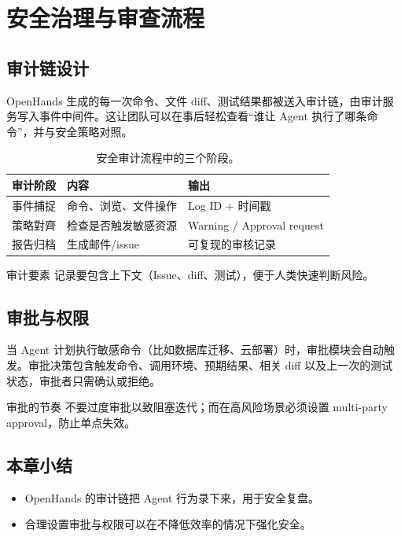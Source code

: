 \section{安全治理与审查流程}
\subsection{审计链设计}
OpenHands 生成的每一次命令、文件 diff、测试结果都被送入审计链，由审计服务写入事件中间件。这让团队可以在事后轻松查看“谁让 Agent 执行了哪条命令”，并与安全策略对照。

\begin{table}[H]
\centering
\begin{tabular}{p{} p{} p{}}
\toprule
审计阶段 & 内容 & 输出 \\
\midrule
事件捕捉 & 命令、浏览、文件操作 & Log ID + 时间戳 \\
\midrule
策略對齊 & 检查是否触发敏感资源 & Warning / Approval request \\
\midrule
报告归档 & 生成邮件/issue & 可复现的审核记录 \\
\bottomrule
\end{tabular}
\caption{安全审计流程中的三个阶段。}
\end{table}

\begin{importantbox}{审计要素}
记录要包含上下文（Issue、diff、测试），便于人类快速判断风险。
\end{importantbox}

\subsection{审批与权限}
当 Agent 计划执行敏感命令（比如数据库迁移、云部署）时，审批模块会自动触发。审批决策包含触发命令、调用环境、预期结果、相关 diff 以及上一次的测试状态，审批者只需确认或拒绝。

\begin{warningbox}{审批的节奏}
不要过度审批以致阻塞迭代；而在高风险场景必须设置 multi-party approval，防止单点失效。
\end{warningbox}

\subsection{本章小结}
\begin{itemize}
    \item OpenHands 的审计链把 Agent 行为录下来，用于安全复盘。
    \item 合理设置审批与权限可以在不降低效率的情况下强化安全。
\end{itemize}

